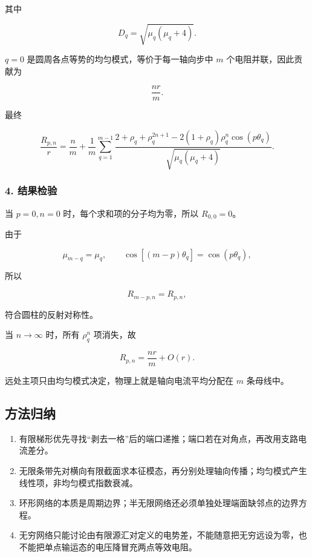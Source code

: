 其中

\[
D_q=\sqrt{\mu_q(\mu_q+4)}.
\]

\(q=0\) 是圆周各点等势的均匀模式，等价于每一轴向步中 \(m\)
个电阻并联，因此贡献为

\[
\frac{nr}{m}.
\]

最终

\[
\boxed{
\frac{R_{p,n}}r=
\frac nm+
\frac1m\sum_{q=1}^{m-1}
\frac{
2+\rho_q+\rho_q^{2n+1}
-2(1+\rho_q)\rho_q^n\cos(p\theta_q)
}{\sqrt{\mu_q(\mu_q+4)}}
}.
\]

\subsubsection{4. 结果检验}\label{m4:ux7ed3ux679cux68c0ux9a8c}

当 \(p=0,n=0\) 时，每个求和项的分子均为零，所以 \(R_{0,0}=0\)。

由于

\[
\mu_{m-q}=\mu_q,\qquad
\cos[(m-p)\theta_q]=\cos(p\theta_q),
\]

所以

\[
R_{m-p,n}=R_{p,n},
\]

符合圆柱的反射对称性。

当 \(n\to\infty\) 时，所有 \(\rho_q^n\) 项消失，故

\[
R_{p,n}=\frac{nr}{m}+O(r).
\]

远处主项只由均匀模式决定，物理上就是轴向电流平均分配在 \(m\) 条母线中。

\subsection{方法归纳}\label{m4:ux65b9ux6cd5ux5f52ux7eb3}

\begin{enumerate}
\def\labelenumi{\arabic{enumi}.}
\tightlist
\item
  有限梯形优先寻找``剥去一格''后的端口递推；端口若在对角点，再改用支路电流差分。
\item
  无限条带先对横向有限截面求本征模态，再分别处理轴向传播；均匀模式产生线性项，非均匀模式指数衰减。
\item
  环形网络的本质是周期边界；半无限网络还必须单独处理端面缺邻点的边界方程。
\item
  无穷网络只能讨论由有限源汇对定义的电势差，不能随意把无穷远设为零，也不能把单点输运态的电压降冒充两点等效电阻。
\end{enumerate}

\backmatter
\par\endgroup
\clearpage
\endgroup
